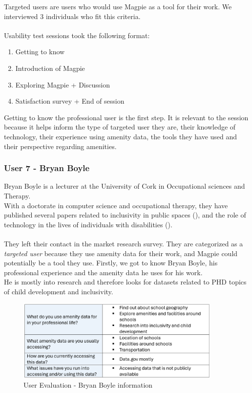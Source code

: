 Targeted users are users who would use Magpie as a tool for their work. We interviewed 3 individuals who fit this criteria.\\ \\
Usability test sessions took the following format:
\begin{enumerate}
    \item Getting to know
    \item Introduction of Magpie
    \item Exploring Magpie + Discussion
    \item Satisfaction survey + End of session
\end{enumerate}
Getting to know the professional user is the first step. It is relevant to the session because it helps inform the type of targeted user they are, their knowledge of technology, their experience using amenity data, the tools they have used and their perspective regarding amenities.

\subsubsection{User 7 - Bryan Boyle}
Bryan Boyle is a lecturer at the University of Cork in Occupational sciences and Therapy.\\ With a doctorate in computer science and occupational therapy, they have published several papers related to inclusivity in public spaces (\cite{bryanboyleplaygroundinclusion2023}), and the role of technology in the lives of individuals with disabilities (\cite{bryanboylechildrenautism2022}).\\ \\
They left their contact in the market research survey. They are categorized as a \emph{targeted user} because they use amenity data for their work, and Magpie could potentially be a tool they use.
\noindent Firstly, we got to know Bryan Boyle, his professional experience and the amenity data he uses for his work.\\
He is mostly into research and therefore looks for datasets related to PHD topics of child development and inclusivity.
\begin{figure}[h!]
    \centering
    \includegraphics[width=0.9\textwidth]{images/bryan-amenity-info.png}
    \caption{User Evaluation - Bryan Boyle information}
\end{figure}\\

